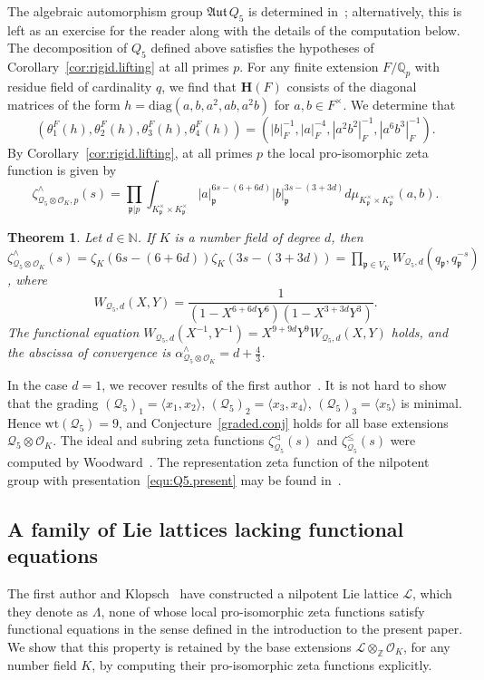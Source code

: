 \documentclass[11pt,a4paper]{amsart}
\theoremstyle{plain}
\newtheorem{thm}{Theorem}[section]
\theoremstyle{remark}
\newcommand{\N}{\mathbb{N}}
\newcommand{\Z}{\mathbb{Z}}
\newcommand{\Q}{\mathbb{Q}}
\newcommand{\tensor}{\otimes}
\newcommand{\p}{\mathfrak{p}}
\def \aAut {\mathfrak{Aut} \,}
\def \p {\ensuremath{\mathfrak{p}}}
\begin{document}
The algebraic automorphism group $\aAut Q_5$ is determined in~\cite[\S3.3.12]{Berman/05}; alternatively, this is left as an exercise for the reader along with the details of the computation below.  The decomposition of $Q_5$ defined above satisfies the hypotheses of Corollary~\ref{cor:rigid.lifting} at all primes $p$.  For any finite extension $F/\Q_p$ with residue field of cardinality $q$, we find that $\mathbf{H}(F)$ consists of the diagonal matrices of the form 
$h = \mathrm{diag}(a,b,a^2,ab,a^2b)$ for $a,b \in F^\times$.  We determine that
$$ (\theta_1^F(h), \theta_2^F(h), \theta_3^F(h), \theta_4^F(h)) = (|b|^{-1}_F, |a|^{-4}_F, |a^2 b^2|^{-1}_F, |a^6 b^3|^{-1}_F).$$
By Corollary~\ref{cor:rigid.lifting}, at all primes $p$ the local pro-isomorphic zeta function is given by
$$ \zeta^\wedge_{\mathcal{Q}_5 \tensor \mathcal{O}_K, p}(s) =  \prod_{\p | p} \int_{K_\p^\times \times K_\p^\times} |a|^{6s - (6 + 6d)}_{\p} |b|^{3s - (3 + 3d)}_{\p} d\mu_{K_\p^\times \times K_\p^\times}(a,b).$$


\begin{thm}
Let $d \in \N$.  If $K$ is a number field of degree $d$, then $\zeta^\wedge_{\mathcal{Q}_5 \tensor \mathcal{O}_K}(s) =  \zeta_K(6s - (6+6d)) \zeta_K(3s - (3+3d)) = \prod_{\p \in V_K} W_{\mathcal{Q}_5, d}(q_{\p}, q_{\p}^{-s})$, where
$$ W_{\mathcal{Q}_5, d}(X,Y) = \frac{1}{(1 - X^{6 + 6d} Y^6)(1 - X^{3 + 3d} Y^3)}.$$
The functional equation $W_{\mathcal{Q}_5, d}(X^{-1}, Y^{-1}) = X^{9+9d}Y^9 W_{\mathcal{Q}_5,d}(X,Y)$ holds, and the abscissa of convergence is $\alpha^\wedge_{\mathcal{Q}_5 \tensor \mathcal{O}_K} = d + \frac{4}{3}$.
\end{thm}

In the case $d = 1$, we recover results of the first author~\cite[\S3.3.12]{Berman/05}.  It is not hard to show that the grading $(\mathcal{Q}_5)_1 = \langle x_1, x_2 \rangle$, $(\mathcal{Q}_5)_2 = \langle x_3, x_4 \rangle$, $(\mathcal{Q}_5)_3 = \langle x_5 \rangle$ is minimal.  Hence $\mathrm{wt}(\mathcal{Q}_5) = 9$, and Conjecture~\ref{graded.conj} holds for all base extensions $\mathcal{Q}_5 \tensor \mathcal{O}_K$.  The ideal and subring zeta functions $\zeta^\vartriangleleft_{\mathcal{Q}_5}(s)$ and $\zeta^\leq_{\mathcal{Q}_5}(s)$ were computed by Woodward~\cite[Theorem~2.41]{duSWoodward/08}.  The representation zeta function of the nilpotent group with presentation~\eqref{equ:Q5.present} may be found in~\cite[Table~5.1]{Ezzat/thesis}.

\subsection{A family of Lie lattices lacking functional equations} \label{sec:bk}
The first author and Klopsch~\cite{BK/15} have constructed a nilpotent Lie lattice $\mathcal{L}$, which they denote as $\Lambda$, none of whose local pro-isomorphic zeta functions satisfy functional equations in the sense defined in the introduction to the present paper.  We show that this property is retained by the base extensions $\mathcal{L} \tensor_\Z \mathcal{O}_K$, for any number field $K$, by computing their pro-isomorphic zeta functions explicitly.
\end{document}

